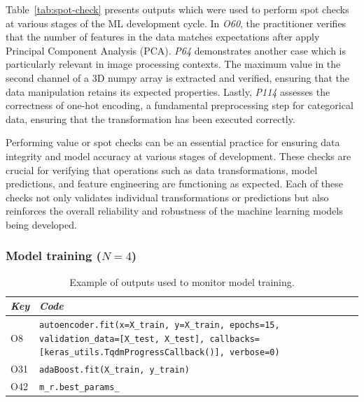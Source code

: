 Table~\ref{tab:spot-check} presents outputs which were used to perform spot checks at various stages of the ML development cycle. In \emph{O60}, the practitioner verifies that the number of features in the data matches expectations after apply Principal Component Analysis (PCA). \emph{P64} demonstrates another case which is particularly relevant in image processing contexts. The maximum value in the second channel of a 3D numpy array is extracted and verified, ensuring that the data manipulation retains its expected properties. Lastly, \emph{P114} assesses the correctness of one-hot encoding, a fundamental preprocessing step for categorical data, ensuring that the transformation has been executed correctly.

Performing value or spot checks can be an essential practice for ensuring data integrity and model accuracy at various stages of development. These checks are crucial for verifying that operations such as data transformations, model predictions, and feature engineering are functioning as expected. Each of these checks not only validates individual transformations or predictions but also reinforces the overall reliability and robustness of the machine learning models being developed.


\subsubsection{Model training ($N = 4$)}

\begin{table}
  \centering
  \caption{Example of outputs used to monitor model training.}
  \begin{tabular}{@{}m{} m{}@{}}
    \toprule
    \emph{\textbf{Key}}&
    \emph{\textbf{Code}}\\
    \midrule

    O8 &
    \lstinline[]$autoencoder.fit(x=X_train, y=X_train, epochs=15, validation_data=[X_test, X_test], callbacks=[keras_utils.TqdmProgressCallback()], verbose=0)$\\

    O31 &
    \lstinline[]$adaBoost.fit(X_train, y_train)$\\

    O42&
    \lstinline[]$m_r.best_params_$\\
    \bottomrule
  \end{tabular}
  \label{tab:model-training}
\end{table}

